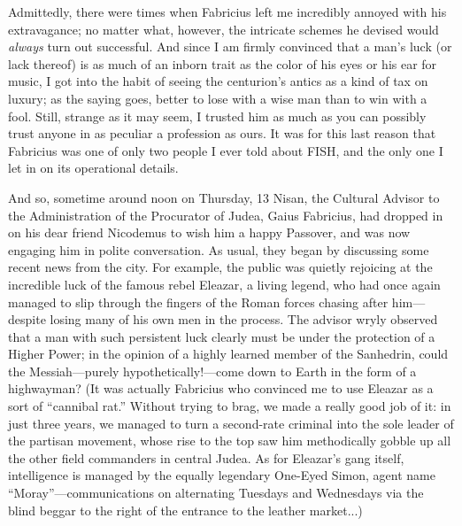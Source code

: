 Admittedly, there were times when Fabricius left me incredibly annoyed with his extravagance; no matter what, however, the intricate schemes he devised would \emph{always} turn out successful. And since I am firmly convinced that a man's luck (or lack thereof) is as much of an inborn trait as the color of his eyes or his ear for music, I got into the habit of seeing the centurion's antics as a kind of tax on luxury; as the saying goes, better to lose with a wise man than to win with a fool. Still, strange as it may seem, I trusted him as much as you can possibly trust anyone in as peculiar a profession as ours. It was for this last reason that Fabricius was one of only two people I ever told about FISH, and the only one I let in on its operational details.

And so, sometime around noon on Thursday, 13 Nisan, the Cultural Advisor to the Administration of the Procurator of Judea, Gaius Fabricius, had dropped in on his dear friend Nicodemus to wish him a happy Passover, and was now engaging him in polite conversation. As usual, they began by discussing some recent news from the city. For example, the public was quietly rejoicing at the incredible luck of the famous rebel Eleazar, a living legend, who had once again managed to slip through the fingers of the Roman forces chasing after him---despite losing many of his own men in the process. The advisor wryly observed that a man with such persistent luck clearly must be under the protection of a Higher Power; in the opinion of a highly learned member of the Sanhedrin, could the Messiah---purely hypothetically!---come down to Earth in the form of a highwayman? (It was actually Fabricius who convinced me to use Eleazar as a sort of ``cannibal rat.'' Without trying to brag, we made a really good job of it: in just three years, we managed to turn a second-rate criminal into the sole leader of the partisan movement, whose rise to the top saw him methodically gobble up all the other field commanders in central Judea. As for Eleazar's gang itself, intelligence is managed by the equally legendary One-Eyed Simon, agent name ``Moray''---communications on alternating Tuesdays and Wednesdays via the blind beggar to the right of the entrance to the leather market...)

